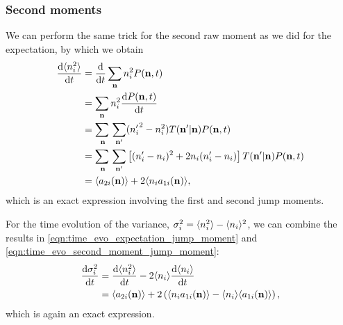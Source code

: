 \subsubsection{Second moments}
We can perform the same trick for the second raw moment as we did for the
expectation, by which we obtain
\begin{equation}
    \begin{aligned}
        \diff{\E{n_i^2}}{t} &= \diff{}{t} \sum_{\V{n}} n_i^2 P(\V{n},t)\\
        &= \sum_{\V{n}} n_i^2 \diff{P(\V{n},t)}{t}\\
        &= \adjustlimits\sum_{\V{n}} \sum_{\V{n}'} ({n_i'}^2 - n_i^2) T(\V{n}' |
        \V{n}) P(\V{n},t)\\
        &= \adjustlimits\sum_{\V{n}} \sum_{\V{n}'} \left[ (n_i' - n_i)^2 + 2n_i(n_i'
        - n_i) \right] T(\V{n}' | \V{n}) P(\V{n},t)\\
        &= \E{a_{2i}(\V{n})} + 2 \E{n_i a_{1i}(\V{n})},
    \end{aligned}
    \label{eqn:time_evo_second_moment_jump_moment}
\end{equation}
which is an exact expression involving the first and second jump moments.

For the time evolution of the variance, \(\sigma_i^2 = \langle n_i^2 \rangle - \langle n_i \rangle^2\),
we can combine the results in \eqref{eqn:time_evo_expectation_jump_moment} and
\eqref{eqn:time_evo_second_moment_jump_moment}:
\begin{equation}
    \begin{aligned}
        \frac{\mathrm{d} \sigma_i^2}{\mathrm{d} t} &= \frac{\mathrm{d} \langle n_i^2 \rangle}{\mathrm{d} t} - 2 \langle n_i \rangle\frac{\mathrm{d} \langle n_i \rangle}{\mathrm{d} t}\\
        &= \langle a_{2i}(\mathbf{n}) \rangle + 2\left( \langle n_i a_{1i}(\mathbf{n}) \rangle - \langle n_i \rangle
        \langle a_{1i}(\mathbf{n}) \rangle \right),
    \end{aligned}
    \label{eqn:time_evo_variance_jump_moment}
\end{equation}
which is again an exact expression.

